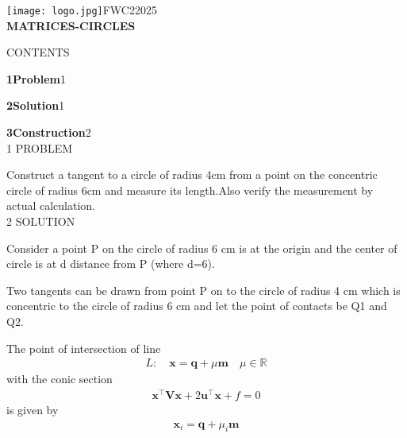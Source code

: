 \documentclass[a4paper,10pt]{report}
\let\vec\mathbf
\begin{document}
\raggedright{\texttt{[image: logo.jpg]}}\hspace{12.425cm}\raggedleft FWC22025\vspace{2mm}\\
\centering\Large\textbf{MATRICES-CIRCLES}\vspace{5mm}
\begin{multicols}{2}
\centering \large\textsc{C}\footnotesize\textsc{ONTENTS}\vspace{5mm}\\
\raggedright\large\textbf{1\hspace{1cm}Problem}\hspace{5.2cm}1\vspace{5mm}\\
\raggedright\large\textbf{2\hspace{1cm}Solution}\hspace{5.25cm}1\vspace{5mm}\\
\raggedright\large\textbf{3\hspace{1cm}Construction}\hspace{4.25cm}2\vspace{5mm}\\
\centering \large\textsc{1  P}\footnotesize\textsc{ROBLEM}\vspace{5mm}\\
\raggedright\large{Construct a tangent to a circle of radius 4cm from a point on the concentric circle of radius 6cm and measure its length.Also verify the measurement by actual calculation.}\vspace{5mm}\\
\centering \large\textsc{2  S}\footnotesize\textsc{OLUTION}\vspace{5mm}\\
\raggedright\large{Consider a point P on the circle of radius 6 cm is at the origin and the center of circle is at d distance from P (where d=6).}\vspace{2mm}\\
\raggedright\large{Two tangents can be drawn from point P on to the circle of radius 4 cm which is concentric to the circle of radius 6 cm and let the point of contacts be Q1 and Q2.}\vspace{2mm}\\
\raggedright\large{The point of intersection of line \begin{align}L: \quad \vec{x} = \vec{q} + \mu \vec{m} \quad \mu \in \mathbb{R}\end{align} with the conic section \begin{align}\vec{x}^{\top}\vec{V}\vec{x}+2\vec{u}^{\top}\vec{x}+f=0\end{align} is given by \begin{align}\vec{x}_i = \vec{q} + \mu_i \vec{m}\end{align}}

\end{multicols}
\end{document}

